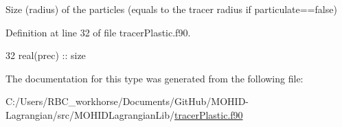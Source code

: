 Size (radius) of the particles (equals to the tracer radius if particulate==false) 



Definition at line 32 of file tracer\+Plastic.\+f90.


\begin{DoxyCode}
32         \textcolor{keywordtype}{real(prec)} :: size
\end{DoxyCode}


The documentation for this type was generated from the following file\+:\begin{DoxyCompactItemize}
\item 
C\+:/\+Users/\+R\+B\+C\+\_\+workhorse/\+Documents/\+Git\+Hub/\+M\+O\+H\+I\+D-\/\+Lagrangian/src/\+M\+O\+H\+I\+D\+Lagrangian\+Lib/\mbox{\hyperlink{tracer_plastic_8f90}{tracer\+Plastic.\+f90}}\end{DoxyCompactItemize}
